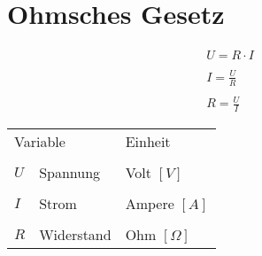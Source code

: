 



\section{Ohmsches Gesetz}
\noindent
\[ \begin{array}{l}
U = R \cdot I\\\\
I = \frac{U}{R}\\\\
R = \frac{U}{I}
\end{array}\]
\begin{tabular}{lll}
\multicolumn{2}{l}{Variable}&Einheit\\\\
$U$&Spannung&Volt $[V]$\\\\
$I$&Strom&Ampere $[A]$\\\\
$R$&Widerstand&Ohm $[\Omega]$
\end{tabular}